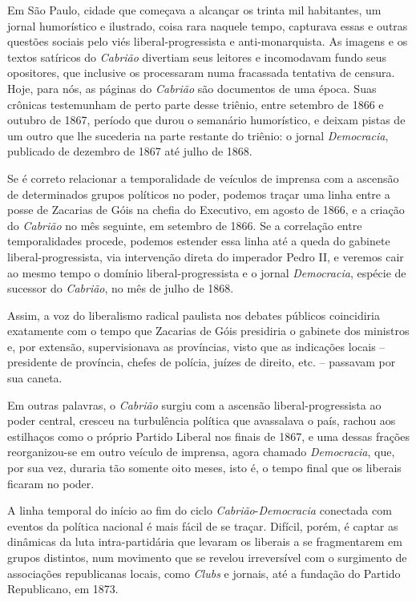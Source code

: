 Em São Paulo, cidade que começava a alcançar os trinta mil habitantes,
um jornal humorístico e ilustrado, coisa rara naquele tempo, capturava
essas e outras questões sociais pelo viés liberal-progressista e
anti-monarquista. As imagens e os textos satíricos do \emph{Cabrião}
divertiam seus leitores e incomodavam fundo seus opositores, que
inclusive os processaram numa fracassada tentativa de censura. Hoje,
para nós, as páginas do \emph{Cabrião} são documentos de uma época. Suas
crônicas testemunham de perto parte desse triênio, entre setembro de
1866 e outubro de 1867, período que durou o semanário humorístico, e
deixam pistas de um outro que lhe sucederia na parte restante do
triênio: o jornal \emph{Democracia}, publicado de dezembro de 1867 até
julho de 1868.

Se é correto relacionar a temporalidade de veículos de imprensa com a
ascensão de determinados grupos políticos no poder, podemos traçar uma
linha entre a posse de Zacarias de Góis na chefia do Executivo, em
agosto de 1866, e a criação do \emph{Cabrião} no mês seguinte, em
setembro de 1866. Se a correlação entre temporalidades procede, podemos
estender essa linha até a queda do gabinete liberal-progressista, via
intervenção direta do imperador Pedro II, e veremos cair ao mesmo tempo
o domínio liberal-progressista e o jornal \emph{Democracia}, espécie de
sucessor do \emph{Cabrião}, no mês de julho de 1868.

Assim, a voz do liberalismo radical paulista nos debates públicos
coincidiria exatamente com o tempo que Zacarias de Góis presidiria o
gabinete dos ministros e, por extensão, supervisionava as províncias,
visto que as indicações locais -- presidente de província, chefes de
polícia, juízes de direito, etc. -- passavam por sua caneta.

Em outras palavras, o \emph{Cabrião} surgiu com a ascensão
liberal-progressista ao poder central, cresceu na turbulência política
que avassalava o país, rachou aos estilhaços como o próprio Partido
Liberal nos finais de 1867, e uma dessas frações reorganizou-se em outro
veículo de imprensa, agora chamado \emph{Democracia}, que, por sua vez,
duraria tão somente oito meses, isto é, o tempo final que os liberais
ficaram no poder.

A linha temporal do início ao fim do ciclo
\emph{Cabrião}-\emph{Democracia} conectada com eventos da política
nacional é mais fácil de se traçar. Difícil, porém, é captar as
dinâmicas da luta intra-partidária que levaram os liberais a se
fragmentarem em grupos distintos, num movimento que se revelou
irreversível com o surgimento de associações republicanas locais, como
\emph{Clubs} e jornais, até a fundação do Partido Republicano, em 1873.


